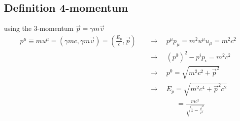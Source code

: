 \documentclass[10pt,a4paper]{book}
\theoremstyle{definition}
\begin{document}
\subsection{Definition 4-momentum}
using the 3-momentum $\vec{p}=\gamma m\vec{v}$
\begin{align}
    p^\mu \equiv mu^\mu=(\gamma mc,\gamma m\vec{v})=\left(\frac{E_p}{c},\vec{p}\right)\quad&\rightarrow\quad p^\mu p _\mu=m^2u^\mu u_\mu=m^2c^2\\
    &\rightarrow\quad (p^0)^2-p^ip_i=m^2c^2\\
    &\rightarrow\quad p^0=\sqrt{m^2c^2+\vec{p}^2}\\
    &\rightarrow\quad E_p=\sqrt{m^2c^4+\vec{p}^2c^2}\\
    &\qquad\qquad=\frac{mc^2}{\sqrt{1-\frac{\vec{v}^2}{c^2}}}
\end{align}
\end{document}
